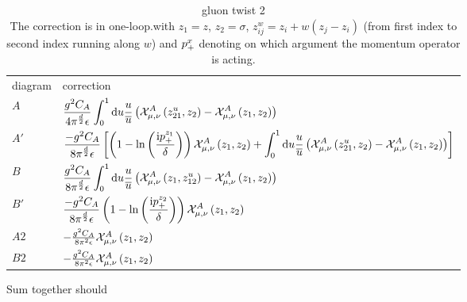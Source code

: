 \def\verticaldistance{\vspace{0.5cm}}
\begin{table}
	\begin{tabular}{p{2cm}p{14cm}}
		diagram&correction \\
		$A$ & ${\displaystyle \frac{g^2C_A}{4\pi^{\frac{d}{2}}\epsilon}
		\int_0^1 \dx u \frac{u}{\overline u}\left(\twtwoop{z_{21}^{u}}{z_2}{A}{\mu}{\nu}  - \twtwoop{z_1}{z_2}{A}{\mu}{\nu} \right)}$\verticaldistance \\
		$A'$ & ${\displaystyle \frac{-g^2C_A}{8\pi^{\frac{d}{2}}\epsilon}\left[\left(1-\ln\left(\frac{\imag \ppon{z_1}}{\delta}\right)\right)\twtwoop{z_1}{z_2}{A}{\mu}{\nu}  + \int_0^1 \dx u \frac{u}{\overline u} \left(\twtwoop{z_{21}^u}{z_2}{A}{\mu}{\nu}-\twtwoop{z_1}{z_2}{A}{\mu}{\nu}\right) \right]}$\verticaldistance \\
		$B$ & ${\displaystyle \frac{g^2C_A}{8\pi^{\frac{d}{2}}\epsilon} \int _0^1 \dx u \frac{u}{\overline u} \left(\twtwoop{z_1}{z_{12}^u}{A}{\mu}{\nu} - \twtwoop{z_1}{z_2}{A}{\mu}{\nu} \right)}$ \verticaldistance \\
		$B'$ & ${\displaystyle 	 \frac{-g^2C_A}{8\pi^{\frac{d}{2}}\epsilon}\left(1-\ln\left(\frac{\imag \ppon{z_2}}{\delta}\right)\right)\twtwoop{z_1}{z_2}{A}{\mu}{\nu}}$\verticaldistance \\
		$A2$ & $-\frac{ g^2 C_A}{8\pi^2 \epsilon} \twtwoop{z_1}{z_2}{A}{\mu}{\nu} $  \verticaldistance \\
		$B2$ & $-\frac{ g^2 C_A}{8\pi^2 \epsilon} \twtwoop{z_1}{z_2}{A}{\mu}{\nu} $\verticaldistance \\
	\end{tabular}
	\caption[caption]{gluon twist 2 \\\hspace{\textwidth}The correction is in one-loop.with $z_1 =z$, $z_2 = \sigma$, $z_{ij}^w = z_i + w(z_j-z_i)$ (from first index to second index running along $w$) and $\ppon{x} $ denoting on which argument the momentum operator is acting.}
	\label{Resultsgluontwist2table}
\end{table}


Sum together should 

\ifdefined\mainprogram{}
\else

\fi